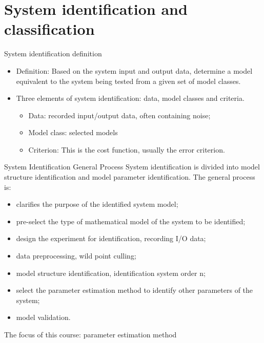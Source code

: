 \section{System identification and classification}


\begin{frame}{System identification definition}
\begin{itemize}
\item    Definition: Based on the system input and output data, determine a model equivalent to the system being tested from a given set of model classes.
\item    Three elements of system identification: data, model classes and criteria.
\begin{itemize}
\item    Data: recorded input/output data, often containing noise;
\item    Model class: selected models
\item    Criterion: This is the cost function, usually the error criterion.
\end{itemize}
\end{itemize}
\end{frame}

\begin{frame}{System Identification General Process}
 System identification is divided into model structure identification and model parameter identification.
The general process is:
\begin{itemize}
\item clarifies the purpose of the identified system model;
\item pre-select the type of mathematical model of the system to be identified;
\item design the experiment for identification, recording I/O data;
\item data preprocessing, wild point culling;
\item model structure identification, identification system order n;
\item select the parameter estimation method to identify other parameters of the system;
\item model validation.
\end{itemize}
The focus of this course: parameter estimation method
\end{frame}

